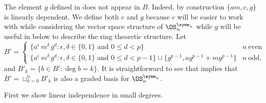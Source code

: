 \documentclass{amsart}
\begin{document}
\begin{remark}\label{remark:LinearBasisG}
    The element $g$ defined in  does not appear in $B$.
    Indeed, by construction $\{am, c, g\}$ is linearly dependent.
    We define both $c$ and $g$ because $c$ will be easier to work with while considering the vector space structure of $\OS_n^{\symm_n}$ while $g$ will be useful in  below to describe the ring theoretic structure.
    Let
    \[
    B' = \begin{cases}
    \{a^\epsilon\, m^\delta\, g^d : \epsilon, \delta \in \{0,1\} \text{ and } 0 \leq d < p \} & n~\text{even} \\
    \{a^\epsilon\, m^\delta\, g^d : \epsilon, \delta \in \{0,1\} \text{ and } 0 \leq d < p -1 \} \cup \{g^{p-1}, ag^{p-1} + mg^{p-1}\} & n~\text{odd},
    \end{cases}
    \]
    and $B'_k = \{b \in B' : \deg b = k\}$.
    It is straightforward to see that  implies that $B' = \sqcup_{k=0}^n B'_k$ is also a graded basis for $\OS_n^{\symm_n}$.
\end{remark}

First we show linear independence in small degrees.
\end{document}
